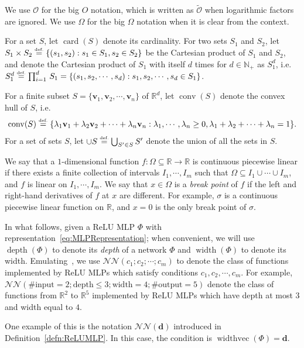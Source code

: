 \documentclass{article}
\numberwithin{equation}{section}
\theoremstyle{definition}
\newcommand{\eqdef}{\ensuremath{\stackrel{\mbox{\upshape\tiny def.}}{=}}}
\begin{document}
We use $\mathcal{O}$ for the big $O$ notation, which is written as $\tilde{\mathcal{O}}$ when logarithmic factors are ignored. We use $\Omega$ for the big $\Omega$ notation when it is clear from the context. 

For a set $S$, let $\operatorname{card}(S)$ denote its cardinality. For two sets $S_1$ and $S_2$, let $S_1 \times S_2 \eqdef \{(s_1,s_2) : s_1 \in S_1, s_2 \in S_2\}$ be the Cartesian product of $S_1$ and $S_2$, and denote the Cartesian product of $S_1$ with itself $d$ times for $d\in\mathbb{N}_+$ as $S_1^d$, i.e. 
$S_1^d \eqdef \prod_{i=1}^d\, S_1= \{ (s_1,s_2,\cdots,s_d) : s_1,s_2,\cdots,s_d \in S_1 \}
$.

For a finite subset $S=\{\mathbf{v}_1,\mathbf{v}_2,\cdots,\mathbf{v}_n\}$ of $\mathbb{R}^d$, let $\operatorname{conv}(S)$ denote the convex hull of $S$, i.e. 
$$\operatorname{conv}(S) \eqdef 
\{ \lambda_1 \mathbf{v}_1 + \lambda_2 \mathbf{v}_2 
+ \cdots
+ \lambda_n \mathbf{v}_n :
\lambda_1,\cdots,\lambda_n \ge 0,
\lambda_1 + \lambda_2 + \cdots + \lambda_n = 1\}
.
$$
For a set of sets $S$, let $\cup S \eqdef \bigcup_{S'\in S} S'$ denote the union of all the sets in $S$. 



We say that a $1$-dimensional function $f:\Omega\subseteq\mathbb{R}\rightarrow\mathbb{R}$ is continuous piecewise linear if there exists a finite collection of intervals $I_1,\cdots,I_m$ such that $\Omega\subseteq I_1\cup\cdots\cup I_m$, and $f$ is linear on $I_1,\cdots,I_m$. We say that $x\in\Omega$ is a \textit{break point} of $f$ if the left and right-hand derivatives of $f$ at $x$ are different. For example, $\sigma$ is a continuous piecewise linear function on $\mathbb{R}$, and $x=0$ is the only break point of $\sigma$.


In what follows, given a ReLU MLP $\Phi$ with representation~\eqref{eq:MLPRepresentation}; when convenient, we will use $\operatorname{depth}(\Phi)$ to denote its \textit{depth} of a network $\Phi$ and $\operatorname{width}(\Phi)$ to denote its width.
Emulating~\cite{ShenYangZhang_JMPA_OptApprx_ReLU}, we use $\mathcal{NN}(c_1;c_2;\cdots;c_m)$ to denote the class of functions implemented by ReLU MLPs which satisfy conditions $c_1,c_2,\cdots,c_m$. For example, $\mathcal{NN}(\#\text{input}=2;\text{depth}\le 3;\text{width} = 4;\#\text{output}=5)$ denote the class of functions from $\mathbb{R}^2$ to $\mathbb{R}^5$ implemented by ReLU MLPs which have depth at most $3$ and width equal to $4$.

One example of this is the notation $\mathcal{NN}(\mathbf{d})$ introduced in Definition~\ref{defn:ReLUMLP}.  In this case, the condition is $\operatorname{widthvec}(\Phi)=\mathbf{d}$.
\end{document}
